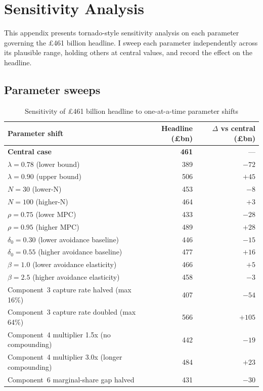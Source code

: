 \documentclass[11pt,letterpaper]{article}
\theoremstyle{remark}
\begin{document}
\section{Sensitivity Analysis}

This appendix presents tornado-style sensitivity analysis on each parameter governing the £461 billion headline. I sweep each parameter independently across its plausible range, holding others at central values, and record the effect on the headline.

\subsection{Parameter sweeps}

\begin{table}[ht]
\centering
\caption{Sensitivity of \pounds461 billion headline to one-at-a-time parameter shifts}
\begin{tabular}{lrr}
\toprule
Parameter shift & Headline (\pounds bn) & $\Delta$ vs central (\pounds bn) \\
\midrule
\textbf{Central case} & \textbf{461} & --- \\
\midrule
$\lambda = 0.78$ (lower bound) & 389 & $-72$ \\
$\lambda = 0.90$ (upper bound) & 506 & $+45$ \\
$N = 30$ (lower-N) & 453 & $-8$ \\
$N = 100$ (higher-N) & 464 & $+3$ \\
$\rho = 0.75$ (lower MPC) & 433 & $-28$ \\
$\rho = 0.95$ (higher MPC) & 489 & $+28$ \\
$\delta_0 = 0.30$ (lower avoidance baseline) & 446 & $-15$ \\
$\delta_0 = 0.55$ (higher avoidance baseline) & 477 & $+16$ \\
$\beta = 1.0$ (lower avoidance elasticity) & 466 & $+5$ \\
$\beta = 2.5$ (higher avoidance elasticity) & 458 & $-3$ \\
Component~3 capture rate halved (max 16\%) & 407 & $-54$ \\
Component~3 capture rate doubled (max 64\%) & 566 & $+105$ \\
Component~4 multiplier 1.5x (no compounding) & 442 & $-19$ \\
Component~4 multiplier 3.0x (longer compounding) & 484 & $+23$ \\
Component~6 marginal-share gap halved & 431 & $-30$ \\

\end{tabular}
\end{table}
\end{document}
